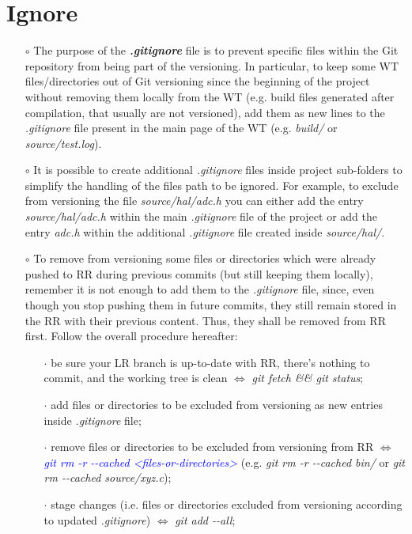 \documentclass[a4paper,portrait,10pt]{article}   %
\newcommand{\mydiv}{$\Leftrightarrow$ }   %
\newcommand{\mycmd}[1]{\textcolor{blue}{\textit{#1}}}   %
\newcommand{\myvspace}{\vspace{4mm}}   %
\begin{document}

\section{Ignore}   \label{sec:Ignore}

\begin{itemize}
\item[$\circ$] The purpose of the \textbf{\textit{.gitignore}} file is to prevent specific files within the Git repository from being part of the versioning. In particular, to keep some WT files/directories out of Git versioning since the beginning of the project without removing them locally from the WT (e.g. build files generated after compilation, that usually are not versioned), add them as new lines to the \textit{.gitignore} file present in the main page of the WT (e.g. \textit{build/} or \textit{source/test.log}).
\myvspace

\item[$\circ$] It is possible to create additional \textit{.gitignore} files inside project sub-folders to simplify the handling of the files path to be ignored. For example, to exclude from versioning the file \textit{source/hal/adc.h} you can either add the entry \textit{source/hal/adc.h} within the main \textit{.gitignore} file of the project or add the entry \textit{adc.h} within the additional \textit{.gitignore} file created inside \textit{source/hal/}.
\myvspace

\item[$\circ$] To remove from versioning some files or directories which were already pushed to RR during previous commits (but still keeping them locally), remember it is not enough to add them to the \textit{.gitignore} file, since, even though you stop pushing them in future commits, they still remain stored in the RR with their previous content. Thus, they shall be removed from RR first. Follow the overall procedure hereafter:
\begin{itemize}
  \item[$\cdot$] be sure your LR branch is up-to-date with RR, there's nothing to commit, and the working tree is clean \mydiv \textit{git fetch \&\& git status};
  \item[$\cdot$] add files or directories to be excluded from versioning as new entries inside \textit{.gitignore} file;
  \item[$\cdot$] remove files or directories to be excluded from versioning from RR \mydiv \mycmd{git rm -r -{}-cached <files-or-directories>} (e.g. \textit{git rm -r -{}-cached bin/} or \textit{git rm -{}-cached source/xyz.c});
  \item[$\cdot$] stage changes (i.e. files or directories excluded from versioning according to updated \textit{.gitignore}) \mydiv \textit{git add -{}-all};
\end{itemize}
\myvspace

\end{itemize}
\myvspace
\end{document}
